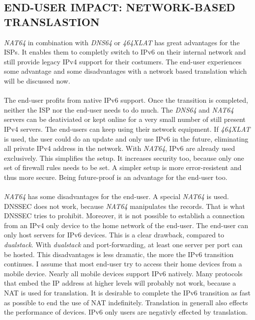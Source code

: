 \documentclass[format=sigconf, natbib=true, nonacm=true]{acmart}
\begin{document}
    \subsection*{END-USER IMPACT: NETWORK-BASED TRANSLASTION}
    \textit{NAT64} in combination with \textit{DNS64} or \textit{464XLAT} has great advantages for the ISPs. It enables them to completly switch to IPv6 on their internal network and still provide legacy IPv4 support for their costumers. The end-user experiences some advantage and some disadvantages with a network based translation which will be discussed now.\\\\The end-user profits from native IPv6 support. Once the transition is completed, neither the ISP nor the end-user needs to do much. The \textit{DNS64} and \textit{NAT64} servers can be deativiated or kept online for a very small number of still present IPv4 servers. The end-users can keep using their network equipment. If \textit{464XLAT} is used, the user could do an update and only use IPv6 in the future, eliminating all private IPv4 address in the network. With \textit{NAT64}, IPv6 are already used exclusively. This simplifies the setup. It increases security too, because only one set of firewall rules needs to be set. A simpler setup is more error-resistent and thus more secure. Being future-proof is an advantage for the end-user too.\\\\\textit{NAT64} has some disadvantages for the end-user. A special \textit{NAT64} is used. DNSSEC does not work, because \textit{NAT64} manipulates the records. That is what DNSSEC tries to prohibit. Moreover, it is not possible to establish a connection from an IPv4 only device to the home network of the end-user. The end-user can only host servers for IPv6 devices. This is a clear drawback, compared to \textit{dualstack}. With \textit{dualstack} and port-forwarding, at least one server per port can be hosted. This disadvantages is less dramatic, the more the IPv6 transition continues. I assume that most end-user try to access their home devices from a mobile device. Nearly all mobile devices support IPv6 natively. Many protocols that embed the IP address at higher levels will probably not work, because a NAT is used for translation. It is desirable to complete the IPv6 transition as fast as possible to end the use of NAT indefinitely. Translation in generall also effects the performance of devices. IPv6 only users are negativly effected by translation\cite{10.1109/TNET.2015.2453338}.
\end{document}
